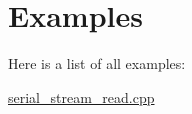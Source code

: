 \section{Examples}
Here is a list of all examples\+:\begin{DoxyCompactItemize}
\item 
\hyperlink{serial_stream_read_8cpp-example}{serial\+\_\+stream\+\_\+read.\+cpp}
\end{DoxyCompactItemize}
